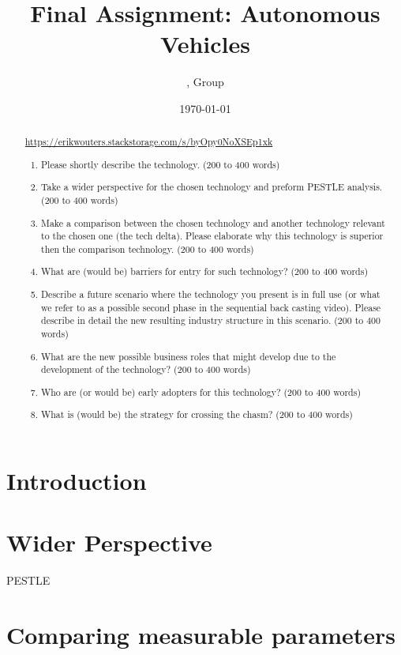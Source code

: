 \documentclass[a4paper]{article}
\title{Final Assignment: Autonomous Vehicles}
\author{\censor{Erik Wouters}, Group \censor{13}}
\date{\today}
\begin{document}
\maketitle

\begin{abstract}
\url{https://erikwouters.stackstorage.com/s/byOpy0NoXSEp1xk}
\begin{enumerate}
    \item Please shortly describe the technology. (200 to 400 words)
    \item Take a wider perspective for the chosen technology and preform PESTLE analysis. (200 to 400 words)
    \item Make a comparison between the chosen technology and another technology relevant to the chosen one (the tech delta). Please elaborate why this technology is superior then the comparison technology. (200 to 400 words)
    \item What are (would be) barriers for entry for such technology? (200 to 400 words)
    \item Describe a future scenario where the technology you present is in full use (or what we refer to as a possible second phase in the sequential back casting video). Please describe in detail the new resulting industry structure in this scenario. (200 to 400 words)
    \item What are the new possible business roles that might develop due to the development of the technology? (200 to 400 words)
    \item Who are (or would be) early adopters for this technology? (200 to 400 words)
    \item What is (would be) the strategy for crossing the chasm? (200 to 400 words)
\end{enumerate}
\end{abstract}

\section{Introduction}
\label{sec:introduction}

\section{Wider Perspective}
\label{sec:selecting}

PESTLE

\section{Comparing measurable parameters}
\label{sec:comparing}
\end{document}
